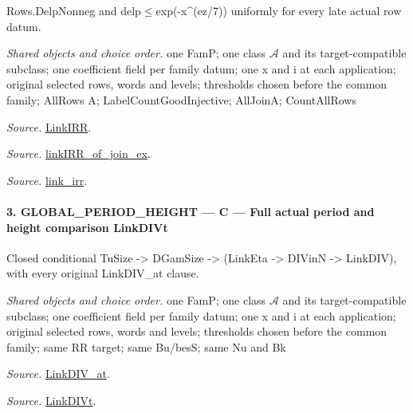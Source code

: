 Rows.DelpNonneg and delp$\le$exp(-x\textasciicircum{}(ez/7)) uniformly for every late actual row datum.

\emph{Shared objects and choice order.} one FamP; one class $\mathcal A$ and its target-compatible subclass; one coefficient field per family datum; one x and i at each application; original selected rows, words and levels; thresholds chosen before the common family; AllRows A; LabelCountGoodInjective; AllJoinA; CountAllRows

\emph{Source.} \href{https://github.com/CocoSgt/riemann-hypothesis-lean/blob/7cbf7a0c32fca1badf05931879a37c3f8a2b03b4/src/Formalism/SharpRestriction/GlobalTheoremInputs.lean#L55-L58}{LinkIRR}.

\emph{Source.} \href{https://github.com/CocoSgt/riemann-hypothesis-lean/blob/7cbf7a0c32fca1badf05931879a37c3f8a2b03b4/src/Development/AbelianVarietyTheory/Proofs/GlobalInterpolation/LinkIRROfJoinEx.lean#L17-L38}{linkIRR\_\allowbreak of\_\allowbreak join\_\allowbreak ex}.

\emph{Source.} \href{https://github.com/CocoSgt/riemann-hypothesis-lean/blob/7cbf7a0c32fca1badf05931879a37c3f8a2b03b4/src/Development/AbelianVarietyTheory/Proofs/GlobalInterpolation/LinkIRROfJoinEx.lean#L143-L166}{link\_\allowbreak irr}.



\paragraph{3. GLOBAL\_\allowbreak PERIOD\_\allowbreak HEIGHT — C — Full actual period and height comparison LinkDIVt}

Closed conditional TuSize -> DGamSize -> (LinkEta -> DIVinN -> LinkDIV), with every original LinkDIV\_\allowbreak at clause.

\emph{Shared objects and choice order.} one FamP; one class $\mathcal A$ and its target-compatible subclass; one coefficient field per family datum; one x and i at each application; original selected rows, words and levels; thresholds chosen before the common family; same RR target; same Bu/besS; same Nu and Bk

\emph{Source.} \href{https://github.com/CocoSgt/riemann-hypothesis-lean/blob/7cbf7a0c32fca1badf05931879a37c3f8a2b03b4/src/Formalism/SharpRestriction/GlobalTheoremInputs.lean#L77-L90}{LinkDIV\_\allowbreak at}.

\emph{Source.} \href{https://github.com/CocoSgt/riemann-hypothesis-lean/blob/7cbf7a0c32fca1badf05931879a37c3f8a2b03b4/src/Formalism/SharpRestriction/GlobalTheoremInputs.lean#L94-L96}{LinkDIVt}.

